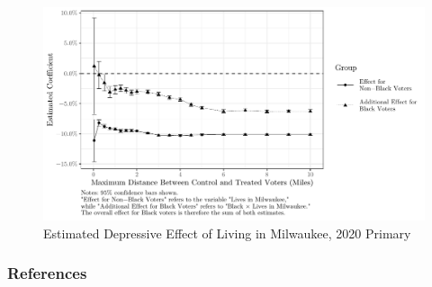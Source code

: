 \documentclass[
  12pt,
]{article}
\begin{document}
\newpage
\begin{figure}[H]

{\centering \includegraphics{mke_turnout_files/figure-latex/plot-1} 

}

\caption{\label{fig:coef-plot}Estimated Depressive Effect of Living in Milwaukee, 2020 Primary}\label{fig:plot}
\end{figure}

\newpage

\hypertarget{references}{%
\subsubsection*{References}\label{references}}
\end{document}
